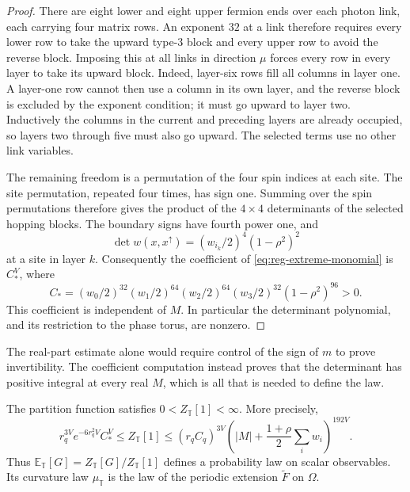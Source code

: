 \documentclass[11pt,letterpaper,reqno]{amsart}
\newcommand{\E}{\mathbb E}
\begin{document}
\begin{proof}
There are eight lower and eight upper fermion ends over each photon
link, each carrying four matrix rows. An exponent $32$ at a link
therefore requires every lower row to take the upward type-$3$
block and every upper row to avoid the reverse block. Imposing this
at all links in direction $\mu$ forces every row in every layer to
take its upward block. Indeed, layer-six rows fill all columns in
layer one. A layer-one row cannot then use a column in its own layer,
and the reverse block is excluded by the exponent condition; it must
go upward to layer two. Inductively the columns in the current and
preceding layers are already occupied, so layers two through five
must also go upward. The selected terms use no other link variables.

The remaining freedom is a permutation of the four spin indices at
each site. The site permutation, repeated four times, has sign one.
Summing over the spin permutations therefore gives the product of
the $4\times4$ determinants of the selected hopping blocks. The
boundary signs have fourth power one, and
\[
 \det w(x,x^\uparrow)
   =(w_{i_k}/2)^4(1-\rho^2)^2
\]
at a site in layer $k$. Consequently the coefficient of
\eqref{eq:reg-extreme-monomial} is $C_*^V$, where
\begin{equation}\label{eq:reg-extreme-coefficient}
 C_*=(w_0/2)^{32}(w_1/2)^{64}(w_2/2)^{64}(w_3/2)^{32}
                                           (1-\rho^2)^{96}>0.
\end{equation}
This coefficient is independent of $M$. In particular the determinant
polynomial, and its restriction to the phase torus, are nonzero.
\end{proof}

The real-part estimate alone would require control of the sign of
$m$ to prove invertibility. The coefficient computation instead
proves that the determinant has positive integral at every real $M$,
which is all that is needed to define the law.

\begin{proposition}\label{prop:reg-partition}
The partition function satisfies $0<Z_{\mathbb T}[1]<\infty$.
More precisely,
\begin{equation}\label{eq:reg-partition-bounds}
 r_q^{3V}e^{-6r_q^2V}C_*^V
 \le Z_{\mathbb T}[1]
 \le(r_qC_q)^{3V}\left(|M|+\frac{1+\rho}{2}\sum_iw_i\right)^{192V}.
\end{equation}
Thus $\E_{\mathbb T}[G]=Z_{\mathbb T}[G]/Z_{\mathbb T}[1]$ defines a
probability law on scalar observables. Its curvature law
$\mu_{\mathbb T}$ is the law of the periodic extension $\widetilde F$
on $\Omega$.
\end{proposition}
\end{document}
